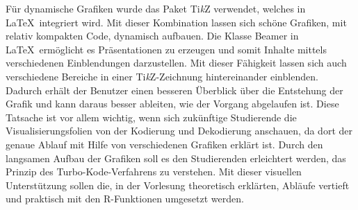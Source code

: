 Für dynamische Grafiken wurde das Paket Ti\textit{k}Z verwendet, welches in \LaTeX\ integriert wird. Mit dieser Kombination lassen sich schöne Grafiken, mit relativ kompakten Code, dynamisch aufbauen. Die Klasse Beamer in \LaTeX\ ermöglicht es Präsentationen zu erzeugen und somit Inhalte mittels verschiedenen Einblendungen darzustellen. Mit dieser Fähigkeit lassen sich auch verschiedene Bereiche in einer Ti\textit{k}Z-Zeichnung hintereinander einblenden. Dadurch erhält der Benutzer einen besseren Überblick über die Entstehung der Grafik und kann daraus besser ableiten, wie der Vorgang abgelaufen ist. Diese Tatsache ist vor allem wichtig, wenn sich zukünftige Studierende die Visualisierungsfolien von der Kodierung und Dekodierung anschauen, da dort der genaue Ablauf mit Hilfe von verschiedenen Grafiken erklärt ist. Durch den langsamen Aufbau der Grafiken soll es den Studierenden erleichtert werden, das Prinzip des Turbo-Kode-Verfahrens zu verstehen. Mit dieser visuellen Unterstützung sollen die, in der Vorlesung theoretisch erklärten, Abläufe vertieft und praktisch mit den R-Funktionen umgesetzt werden.  